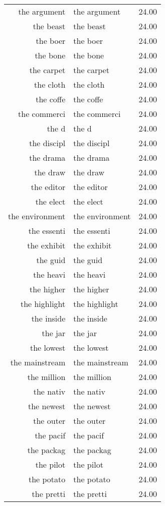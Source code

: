 \begin{table}[ht]
\begin{tabular}{rlr}
  the argument & the argument & 24.00 \\ 
  the beast & the beast & 24.00 \\ 
  the boer & the boer & 24.00 \\ 
  the bone & the bone & 24.00 \\ 
  the carpet & the carpet & 24.00 \\ 
  the cloth & the cloth & 24.00 \\ 
  the coffe & the coffe & 24.00 \\ 
  the commerci & the commerci & 24.00 \\ 
  the d & the d & 24.00 \\ 
  the discipl & the discipl & 24.00 \\ 
  the drama & the drama & 24.00 \\ 
  the draw & the draw & 24.00 \\ 
  the editor & the editor & 24.00 \\ 
  the elect & the elect & 24.00 \\ 
  the environment & the environment & 24.00 \\ 
  the essenti & the essenti & 24.00 \\ 
  the exhibit & the exhibit & 24.00 \\ 
  the guid & the guid & 24.00 \\ 
  the heavi & the heavi & 24.00 \\ 
  the higher & the higher & 24.00 \\ 
  the highlight & the highlight & 24.00 \\ 
  the inside & the inside & 24.00 \\ 
  the jar & the jar & 24.00 \\ 
  the lowest & the lowest & 24.00 \\ 
  the mainstream & the mainstream & 24.00 \\ 
  the million & the million & 24.00 \\ 
  the nativ & the nativ & 24.00 \\ 
  the newest & the newest & 24.00 \\ 
  the outer & the outer & 24.00 \\ 
  the pacif & the pacif & 24.00 \\ 
  the packag & the packag & 24.00 \\ 
  the pilot & the pilot & 24.00 \\ 
  the potato & the potato & 24.00 \\ 
  the pretti & the pretti & 24.00 \\ 

\end{tabular}
\end{table}
